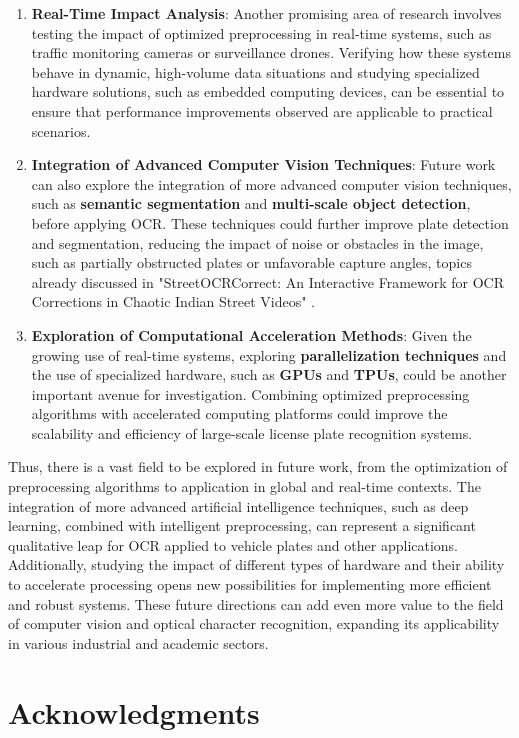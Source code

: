 \documentclass[conference]{IEEEtran}
\begin{document}
\begin{enumerate}
		\item \textbf{Real-Time Impact Analysis}: Another promising area of research involves testing the impact of optimized preprocessing in real-time systems, such as traffic monitoring cameras or surveillance drones. Verifying how these systems behave in dynamic, high-volume data situations and studying specialized hardware solutions, such as embedded computing devices, can be essential to ensure that performance improvements observed are applicable to practical scenarios.
		\item \textbf{Integration of Advanced Computer Vision Techniques}: Future work can also explore the integration of more advanced computer vision techniques, such as \textbf{semantic segmentation} and \textbf{multi-scale object detection}, before applying OCR. These techniques could further improve plate detection and segmentation, reducing the impact of noise or obstacles in the image, such as partially obstructed plates or unfavorable capture angles, topics already discussed in "StreetOCRCorrect: An Interactive Framework for OCR Corrections in Chaotic Indian Street Videos" \cite{b13}.
		\item \textbf{Exploration of Computational Acceleration Methods}: Given the growing use of real-time systems, exploring \textbf{parallelization techniques} and the use of specialized hardware, such as \textbf{GPUs} and \textbf{TPUs}, could be another important avenue for investigation. Combining optimized preprocessing algorithms with accelerated computing platforms could improve the scalability and efficiency of large-scale license plate recognition systems.
	\end{enumerate}
	
	Thus, there is a vast field to be explored in future work, from the optimization of preprocessing algorithms to application in global and real-time contexts. The integration of more advanced artificial intelligence techniques, such as deep learning, combined with intelligent preprocessing, can represent a significant qualitative leap for OCR applied to vehicle plates and other applications. Additionally, studying the impact of different types of hardware and their ability to accelerate processing opens new possibilities for implementing more efficient and robust systems. These future directions can add even more value to the field of computer vision and optical character recognition, expanding its applicability in various industrial and academic sectors.
	
	\section{Acknowledgments}
	
\end{document}
